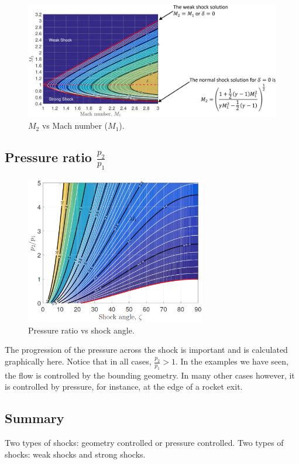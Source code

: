 \documentclass[class=report, crop=false, 12pt,a4paper]{standalone}
\begin{document}
\begin{figure}[H]
    \centering
    \includegraphics[width = \textwidth]{../img/diagram16.png}
    \caption{$M_2$ vs Mach number ($M_1$).}
\end{figure}
\subsection{Pressure ratio $\frac{p_2}{p_1}$}
\begin{figure}[H]
    \centering
    \includegraphics[width = 0.7\textwidth]{../img/diagram17.png}
    \caption{Pressure ratio vs shock angle.}
\end{figure}
The progression of the pressure across the shock is important and is calculated graphically here. Notice that in all cases, $\frac{p_2}{p_1}>1$. In the examples we have seen, the flow is controlled by the bounding geometry. In many other cases however, it is controlled by pressure, for instance, at the edge of a rocket exit.
\subsection{Summary}
Two types of shocks: geometry controlled or pressure controlled.
Two types of shocks: weak shocks and strong shocks.
\end{document}
